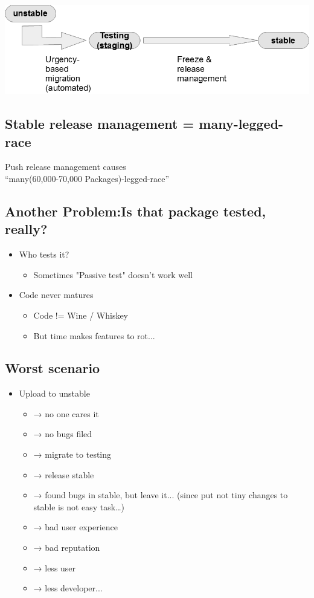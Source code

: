 \documentclass[mingoth,a4paper]{jsarticle}
\begin{document}
\includegraphics[width=\linewidth]{image201711-tokyo/Rethinking-debian-release-p3_gray.png}

\subsection{Stable release management  = many-legged-race}
\noindent
Push release management causes
\\
“many(60,000-70,000 Packages)-legged-race”
\\

\subsection{Another Problem:Is that package tested, really?}

\begin{itemize}
 \item Who tests it?
  \begin{itemize}
   \item Sometimes "Passive test" doesn't work well
  \end{itemize}
 \item Code never matures
  \begin{itemize}
   \item Code != Wine / Whiskey
   \item But time makes features to rot...
  \end{itemize}
\end{itemize}

\subsection{Worst scenario}
\begin{itemize}
 \item Upload to unstable
  \begin{itemize}
   \item → no one cares it
   \item → no bugs filed
   \item → migrate to testing
   \item → release stable
   \item → found bugs in stable, but leave it...
  (since put not tiny changes to stable is not easy task…)
   \item → bad user experience
   \item → bad reputation
   \item → less user
   \item → less developer...
  \end{itemize}
\end{itemize}
   
\end{document}
